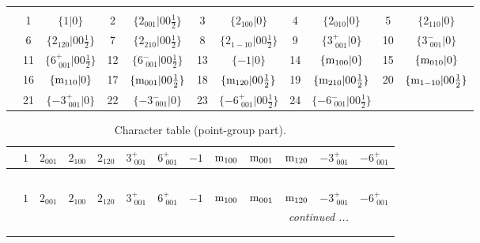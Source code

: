 \documentclass[fleqn,10pt,landscape]{article}
\begin{document}
\begin{itemize}
\begin{center}
\begin{longtable}{c|cc|cc|cc|cc|cc}
 \hline \hline
\multicolumn{10}{r}{} \\ \endlastfoot

 & 1 & $\{1|0\}$ & 2 & $\{2{}_{001}|0 0 \frac{1}{2}\}$ & 3 & $\{2{}_{100}|0\}$ & 4 & $\{2{}_{010}|0\}$ & 5 & $\{2{}_{110}|0\}$ \\
& 6 & $\{2{}_{120}|0 0 \frac{1}{2}\}$ & 7 & $\{2{}_{210}|0 0 \frac{1}{2}\}$ & 8 & $\{2{}_{1-10}|0 0 \frac{1}{2}\}$ & 9 & $\{3^{+}_{\,\,001}|0\}$ & 10 & $\{3^{-}_{\,\,001}|0\}$ \\
& 11 & $\{6^{+}_{\,\,001}|0 0 \frac{1}{2}\}$ & 12 & $\{6^{-}_{\,\,001}|0 0 \frac{1}{2}\}$ & 13 & $\{-1|0\}$ & 14 & $\{{\rm m}_{100}|0\}$ & 15 & $\{{\rm m}_{010}|0\}$ \\
& 16 & $\{{\rm m}_{110}|0\}$ & 17 & $\{{\rm m}_{001}|0 0 \frac{1}{2}\}$ & 18 & $\{{\rm m}_{120}|0 0 \frac{1}{2}\}$ & 19 & $\{{\rm m}_{210}|0 0 \frac{1}{2}\}$ & 20 & $\{{\rm m}_{1-10}|0 0 \frac{1}{2}\}$ \\
& 21 & $\{-3^{+}_{\,\,001}|0\}$ & 22 & $\{-3^{-}_{\,\,001}|0\}$ & 23 & $\{-6^{+}_{\,\,001}|0 0 \frac{1}{2}\}$ & 24 & $\{-6^{-}_{\,\,001}|0 0 \frac{1}{2}\}$ &  &  \\
\end{longtable}
\end{center}
\begin{center}
\renewcommand{\arraystretch}{1.0}
\begin{longtable}{c|rrrrrrrrrrrr}
\caption{Character table (point-group part).}
 \\
 \hline \hline
 & $ 1 $ & $ 2{}_{001} $ & $ 2{}_{100} $ & $ 2{}_{120} $ & $ 3^{+}_{\,\,001} $ & $ 6^{+}_{\,\,001} $ & $ -1 $ & $ {\rm m}_{100} $ & $ {\rm m}_{001} $ & $ {\rm m}_{120} $ & $ -3^{+}_{\,\,001} $ & $ -6^{+}_{\,\,001} $ \\ \hline \endfirsthead

\multicolumn{12}{l}{\tablename\ \thetable{}} \\
 \hline \hline
 & $ 1 $ & $ 2{}_{001} $ & $ 2{}_{100} $ & $ 2{}_{120} $ & $ 3^{+}_{\,\,001} $ & $ 6^{+}_{\,\,001} $ & $ -1 $ & $ {\rm m}_{100} $ & $ {\rm m}_{001} $ & $ {\rm m}_{120} $ & $ -3^{+}_{\,\,001} $ & $ -6^{+}_{\,\,001} $ \\ \hline \endhead

 \hline \hline
\multicolumn{12}{r}{\footnotesize\it continued ...} \\ \endfoot

 \hline \hline
\multicolumn{12}{r}{} \\ \endlastfoot


\end{longtable}
\end{center}
\end{itemize}
\end{document}
